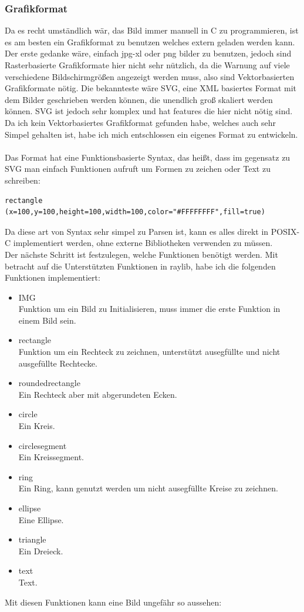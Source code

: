 \subsubsection{Grafikformat}
Da es recht umständlich wär, das Bild immer manuell in C zu programmieren, ist es am besten ein Grafikformat zu benutzen welches extern geladen werden kann. Der erste gedanke wäre, einfach jpg-xl oder png bilder zu benutzen, jedoch sind Rasterbasierte Grafikformate hier nicht sehr nützlich, da die Warnung auf viele verschiedene Bildschirmgrößen angezeigt werden muss, also sind Vektorbasierten Grafikformate nötig. Die bekannteste wäre SVG, eine XML basiertes Format mit dem Bilder geschrieben werden können, die unendlich groß skaliert werden können. SVG ist jedoch sehr komplex und hat features die hier nicht nötig sind.\\
Da ich kein Vektorbasiertes Grafikformat gefunden habe, welches auch sehr Simpel gehalten ist, habe ich mich entschlossen ein eigenes Format zu entwickeln.\\
\\
Das Format hat eine Funktionsbasierte Syntax, das heißt, dass im gegensatz zu SVG man einfach Funktionen aufruft um Formen zu zeichen oder Text zu schreiben:
\begin{verbatim}
rectangle (x=100,y=100,height=100,width=100,color="#FFFFFFFF",fill=true)
\end{verbatim}
Da diese art von Syntax sehr simpel zu Parsen ist, kann es alles direkt in POSIX-C implementiert werden, ohne externe Bibliotheken verwenden zu müssen.\\
Der nächste Schritt ist festzulegen, welche Funktionen benötigt werden. Mit betracht auf die Unterstützten Funktionen in raylib, habe ich die folgenden Funktionen implementiert:
\begin{itemize}
\item IMG\\
  Funktion um ein Bild zu Initialisieren, muss immer die erste Funktion in einem Bild sein.
\item rectangle\\
  Funktion um ein Rechteck zu zeichnen, unterstützt ausegfüllte und nicht ausgefüllte Rechtecke.
\item roundedrectangle\\
  Ein Rechteck aber mit abgerundeten Ecken.
\item circle\\
  Ein Kreis.
\item circlesegment\\
  Ein Kreissegment.
\item ring\\
  Ein Ring, kann genutzt werden um nicht ausegfüllte Kreise zu zeichnen.
\item ellipse\\
  Eine Ellipse.
\item triangle\\
  Ein Dreieck.
\item text\\
  Text.
\end{itemize}
Mit diesen Funktionen kann eine Bild ungefähr so aussehen:\\

